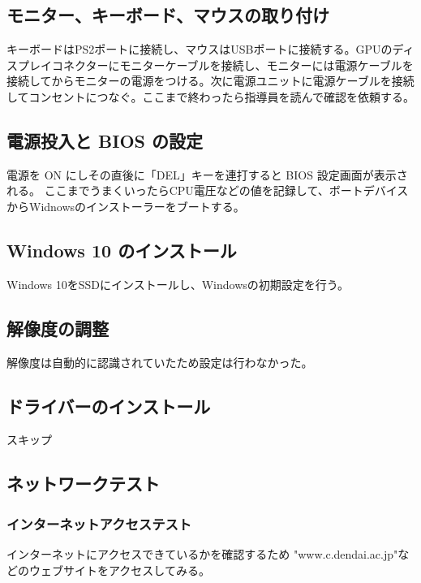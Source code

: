 \documentclass[10pt]{article}
\begin{document}
\subsection{モニター、キーボード、マウスの取り付け}
\hspace{1cm}キーボードはPS2ポートに接続し、マウスはUSBポートに接続する。GPUのディスプレイコネクターにモニターケーブルを接続し、モニターには電源ケーブルを接続してからモニターの電源をつける。次に電源ユニットに電源ケーブルを接続してコンセントにつなぐ。ここまで終わったら指導員を読んで確認を依頼する。


\subsection{ 電源投入と BIOS の設定}
\hspace{1cm}			
 電源を ON にしその直後に「DEL」キーを連打すると BIOS 設定画面が表示される。 ここまでうまくいったらCPU電圧などの値を記録して、ボートデバイスからWidnowsのインストーラーをブートする。

\subsection{Windows 10 のインストール}
\hspace{1cm}Windows 10をSSDにインストールし、Windowsの初期設定を行う。

\subsection{解像度の調整}
\hspace{1cm}解像度は自動的に認識されていたため設定は行わなかった。

\subsection{ドライバーのインストール}
\hspace{1cm} スキップ

\subsection{ネットワークテスト}
\hspace{1cm}
\subsubsection{インターネットアクセステスト}
	インターネットにアクセスできているかを確認するため "www.c.dendai.ac.jp"などのウェブサイトをアクセスしてみる。 
\end{document}
